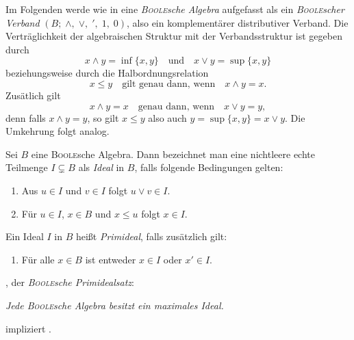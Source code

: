 Im Folgenden werde wie in \cite{graetzer2003general} eine \textit{\textsc{Boole}sche Algebra} aufgefasst als ein \textit{\textsc{Boole}scher Verband} $(B; \;\land, \;\lor, \;', \;1, \;0)$, also ein komplementärer distributiver Verband. 
Die Verträglichkeit der algebraischen Struktur mit der Verbandsstruktur ist gegeben durch 
\begin{displaymath}
  x \land y = \inf\{x,y\} \quad \text{und} \quad x \lor y = \sup\{x,y\}
\end{displaymath}
beziehungsweise durch die Halbordnungsrelation 
\begin{displaymath}
  x \leq y \quad \text{gilt genau dann, wenn} \quad x \land y = x.
\end{displaymath}
Zusätlich gilt 
\begin{displaymath}
  x \land y = x \quad \text{genau dann, wenn} \quad x \lor y = y,
\end{displaymath}
denn falls $x \land y = y$, so gilt $x \leq y$ also auch $y = \sup\{x,y\} = x \lor y$. 
Die Umkehrung folgt analog.

\begin{defn}
  Sei $B$ eine \textsc{Boole}sche Algebra. Dann bezeichnet man eine nichtleere echte Teilmenge $I \subsetneq B$ als \textit{Ideal} in $B$, falls folgende Bedingungen gelten:
  \begin{enumerate}[(1)]
    \item Aus $u \in I$ und $v \in I$ folgt $u \lor v \in I$.
    \item Für $u \in I$, $x \in B$ und $x \leq u$ folgt  $x \in I$.
  \end{enumerate}
  Ein Ideal $I$ in $B$ heißt \textit{Primideal}, falls zusätzlich gilt:
  \begin{enumerate}[(3)]
    \item Für alle $x \in B$ ist entweder $x \in I$ oder $x' \in I$.
  \end{enumerate}
\end{defn}

\begin{defn}
    \PIT, der \textit{\textsc{Boole}sche Primidealsatz}:
      \begin{addmargin}[2em]{2em}%
        \textit{Jede \textsc{Boole}sche Algebra besitzt ein maximales Ideal.}
      \end{addmargin}
\end{defn}

\begin{thm}
  \label{thm:acpit}
  \AC impliziert \PIT.
\end{thm}

